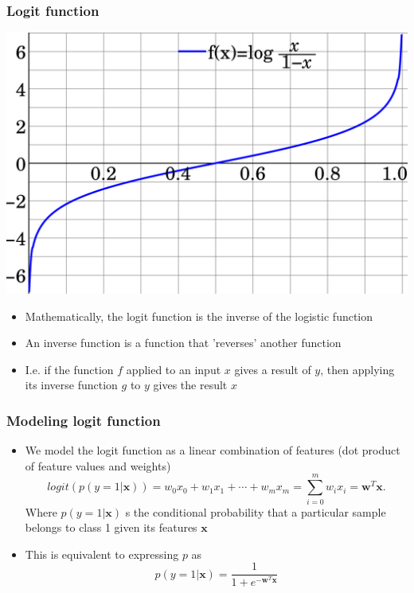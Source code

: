 \documentclass{beamer}
\begin{document}
\begin{frame}
  \frametitle{Logit function}
  \begin{center}
  \includegraphics[scale=0.09]{Images/logit-function.png}
  \end{center}
  \begin{itemize}
  \item Mathematically, the logit function is the inverse of the logistic function
  \item An inverse function is a function that 'reverses' another function
  \item I.e. if the function $f$ applied to an input $x$ gives a result of $y$, then applying its inverse function $g$ to $y$ gives the result $x$
  \end{itemize}

\end{frame}

\begin{frame}
  \frametitle{Modeling logit function}
  \begin{itemize}
  \item We model the logit function as a linear combination of features (dot product of feature values and weights)
    \[
    logit ( p (y=1 | \mathbf{x})) = w_0 x_0 + w_1 x_1 + \cdots + w_m x_m = \sum^{m}_{i=0} w_i x_i = \mathbf{w}^T \mathbf{x}.
    \]
    Where $p(y=1 | \mathbf{x})$ s the conditional probability that a particular sample belongs to class 1 given its features $\mathbf{x}$
  \item This is equivalent to expressing $p$ as
    \[
    p(y = 1 | \mathbf{x}) = \frac{1}{1 + e^{-\mathbf{w}^T \mathbf{x}}}
    \]
  \end{itemize}
\end{frame}
\end{document}
